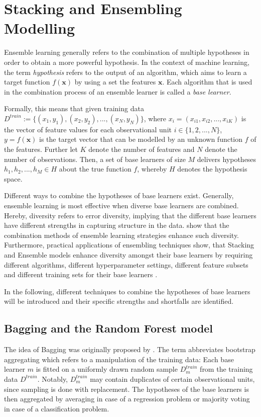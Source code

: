\documentclass[12pt]{article}
\begin{document}
\section{Stacking and Ensembling Modelling}
Ensemble learning generally refers to the combination of multiple hypotheses in order to obtain a more powerful hypothesis. In the context of machine learning, the term \textit{hypothesis} refers to the output of an algorithm, which aims to learn a target function $f(\mathbf{x})$ by using a set the features $\mathbf{x}$. Each algorithm that is used in the combination process of an ensemble learner is called a \textit{base learner}.

Formally, this means that given training data $D^{train} := \{(x_1, y_1), (x_2, y_2),..., (x_N, y_N)\}$, where $x_i = (x_{i1}, x_{i2},..., x_{iK})$ is the vector of feature values for each observational unit $i \in \{1, 2,..., N\}$, $y = f(\mathbf{x})$ is the target vector that can be modelled by an unknown function $f$ of the features. Further let $K$ denote the number of features and $N$ denote the number of observations. Then, a set of base learners of size $M$ delivers hypotheses $h_1, h_2,..., h_M \in H$ about the true function $f$, whereby $H$ denotes the hypothesis space.

Different ways to combine the hypotheses of base learners exist. Generally, ensemble learning is most effective when diverse base learners are combined. Hereby, diversity refers to error diversity, implying that the different base learners have different strengths in capturing structure in the data. \cite{brown2005diversity} show that the combination methods of ensemble learning strategies enhance such diversity. Furthermore, practical applications of ensembling techniques show, that Stacking and Ensemble models enhance diversity amongst their base learners by requiring different algorithms, different hyperparameter settings, different feature subsets and different training sets for their base learners \citep{online2017stacking}. 

In the following, different techniques to combine the hypotheses of base learners will be introduced and their specific strengths and shortfalls are identified. 

\subsection{Bagging and the Random Forest model}
The idea of Bagging was originally proposed by \cite{breiman1996bagging}. The term abbreviates bootstrap aggregating which refers to a manipulation of the training data: Each base learner $m$ is fitted on a uniformly drawn random sample $D^{train}_m$ from the training data $D^{train}$. Notably, $D^{train}_m$ may contain duplicates of certain observational units, since sampling is done with replacement. The hypotheses of the base learners is then aggregated by averaging in case of a regression problem or majority voting in case of a classification problem. 
\end{document}
